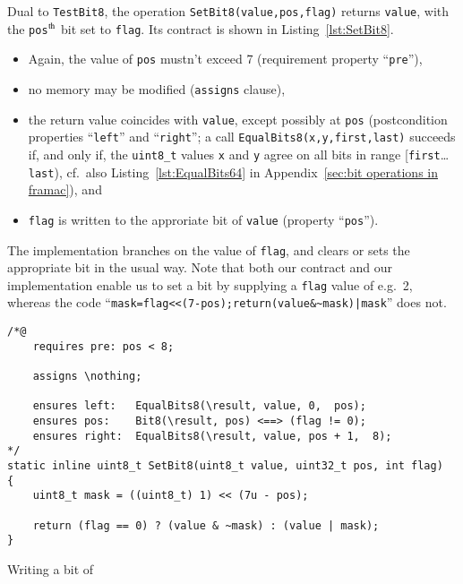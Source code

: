 Dual to \lstinline{TestBit8}, the operation
\lstinline{SetBit8(value,pos,flag)}
returns \lstinline{value}, 
with the \lstinline{pos}$^{\mbox{\scriptsize th}}$ bit
set to \lstinline{flag}.
%
Its contract is shown in Listing~\ref{lst:SetBit8}.
%
\begin{itemize}
\item Again, the value of \lstinline{pos} mustn't exceed 7 
	(requirement property ``\lstinline{pre}''),
\item no memory may be modified (\lstinline{assigns} clause),
\item the return value coincides with \lstinline{value}, except possibly
	at \lstinline{pos} (postcondition properties ``\lstinline{left}'' 
	and ``\lstinline{right}''; a call
	\lstinline{EqualBits8(x,y,first,last)} succeeds if, and
	only if, the \lstinline{uint8_t} values \lstinline{x} and
	\lstinline{y} agree on all bits in range
	[\lstinline{first}\ldots\lstinline{last}), cf.\ also
	Listing~\ref{lst:EqualBits64} in 
	Appendix~\ref{sec:bit operations in framac}), and 
\item \lstinline{flag} is written to the approriate bit of 
	\lstinline{value} (property ``\lstinline{pos}'').
\end{itemize}
%
The implementation branches on the value of \lstinline{flag}, and
clears or sets the
appropriate bit in the usual way.
%
Note that both our contract and our implementation enable us to set
a bit by supplying a
\lstinline{flag} value of e.g.\ 2, whereas the code 
``\lstinline{mask=flag<<(7-pos);return(value&~mask)|mask}'' does not.





\begin{listing}[hbt]
\begin{minipage}{0.99\textwidth}
\begin{lstlisting}[style=acsl-block]
/*@
    requires pre: pos < 8;

    assigns \nothing;

    ensures left:   EqualBits8(\result, value, 0,  pos);
    ensures pos:    Bit8(\result, pos) <==> (flag != 0);
    ensures right:  EqualBits8(\result, value, pos + 1,  8);
*/
static inline uint8_t SetBit8(uint8_t value, uint32_t pos, int flag)
{
    uint8_t mask = ((uint8_t) 1) << (7u - pos);

    return (flag == 0) ? (value & ~mask) : (value | mask);
}
\end{lstlisting}
\end{minipage}
\caption{\label{lst:SetBit8}Writing a bit of }
\end{listing}






















